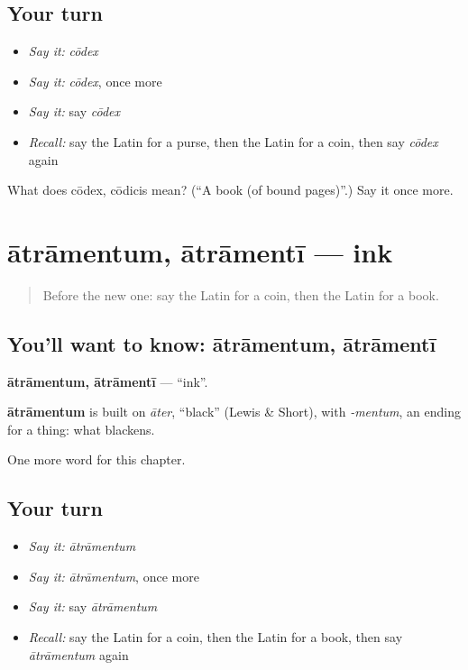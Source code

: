 \subsection*{Your turn}
\begin{itemize}
\raggedright
  \item \emph{Say it:} \emph{cōdex}
  \item \emph{Say it:} \emph{cōdex}, once more
  \item \emph{Say it:} say \emph{cōdex}
  \item \emph{Recall:} say the Latin for a purse, then the Latin for a coin, then say \emph{cōdex} again
\end{itemize}

\begin{tcolorbox}[breakable,colback=teal!4,colframe=teal!35!black,title={Before you move on}]
What does cōdex, cōdicis mean? (\textquotedblleft{}A book (of bound pages)\textquotedblright{}.) Say it once more.
\end{tcolorbox}
\section[ātrāmentum, ātrāmentī]{ātrāmentum, ātrāmentī — ink}

\label{lesson:LA-C124-atramentum}



\begin{quote}
Before the new one: say the Latin for a coin, then the Latin for a book.
\end{quote}

\subsection*{You'll want to know: ātrāmentum, ātrāmentī}
\textbf{ātrāmentum, ātrāmentī} — \textquotedblleft{}ink\textquotedblright{}.

\begin{cousinweb}
\textbf{ātrāmentum} is built on \emph{āter}, \textquotedblleft{}black\textquotedblright{} (Lewis \& Short), with \emph{-mentum}, an ending for a thing: what blackens.
\end{cousinweb}

\begin{grammarlens}[title={What you've built}]
One more word for this chapter.
\end{grammarlens}

\subsection*{Your turn}
\begin{itemize}
\raggedright
  \item \emph{Say it:} \emph{ātrāmentum}
  \item \emph{Say it:} \emph{ātrāmentum}, once more
  \item \emph{Say it:} say \emph{ātrāmentum}
  \item \emph{Recall:} say the Latin for a coin, then the Latin for a book, then say \emph{ātrāmentum} again
\end{itemize}

